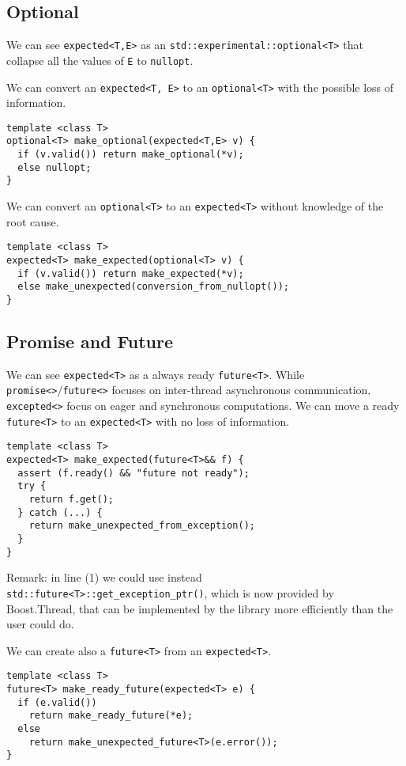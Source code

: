 \documentclass[a4paper,10pt]{article}
\newcommand{\cpp}[1]{\lstinline{#1}}
\begin{document}
\subsection{Optional}

We can see \cpp{expected<T,E>} as an \cpp{std::experimental::optional<T>} that collapse all the values of \cpp{E} to \cpp{nullopt}. 

We can convert an \cpp{expected<T, E>} to an \cpp{optional<T>} with the possible loss of information.

\begin{lstlisting}
template <class T>
optional<T> make_optional(expected<T,E> v) {
  if (v.valid()) return make_optional(*v);
  else nullopt;
}
\end{lstlisting}

We can convert an \cpp{optional<T>} to an \cpp{expected<T>} without knowledge of the root cause.

\begin{lstlisting}
template <class T>
expected<T> make_expected(optional<T> v) {
  if (v.valid()) return make_expected(*v);
  else make_unexpected(conversion_from_nullopt());
}
\end{lstlisting}

\subsection{Promise and Future}

We can see \cpp{expected<T>} as a always ready \cpp{future<T>}.
While \cpp{promise<>}/\cpp{future<>} focuses on inter-thread asynchronous communication, \cpp{excepted<>} focus on eager and synchronous computations.
We can move a ready \cpp{future<T>} to an \cpp{expected<T>} with no loss of information. 

\begin{lstlisting}
template <class T>
expected<T> make_expected(future<T>&& f) {
  assert (f.ready() && "future not ready");
  try {
    return f.get();
  } catch (...) {
    return make_unexpected_from_exception();
  }
}
\end{lstlisting}

Remark: in line (1) we could use instead \cpp{std::future<T>::get_exception_ptr()}, which is now provided by Boost.Thread, that can be implemented by the library more efficiently than the user could do.

We can create also a \cpp{future<T>} from an \cpp{expected<T>}.

\begin{lstlisting}
template <class T>
future<T> make_ready_future(expected<T> e) {
  if (e.valid()) 
    return make_ready_future(*e);
  else 
    return make_unexpected_future<T>(e.error()); 
}
\end{lstlisting}
\end{document}
